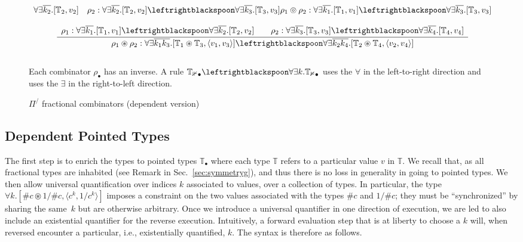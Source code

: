 \documentclass[a4paper,USenglish]{lipics-v2016-utf8x}
\newcommand{\hash}{\#}
\newcommand{\order}[1]{\hash #1}
\newcommand{\iorder}[1]{1/\hash #1}
\newcommand{\Rule}[4]{
\makebox{{\rm #1}
$\displaystyle
\frac{\begin{array}{l}#2\\\end{array}}
{\begin{array}{l}#3\\\end{array}}$
 #4}}
\newcommand{\jdg}[3]{{#1} #3}
\newcommand{\synch}{\mathsf{{synch}}}
\begin{document}
\begin{figure}[t]
{\[\begin{array}{c}
{{  \forall\exists{\overline{k_2}}.[\mathbb{T}_2,v_2]} \quad
  \rho_2 :
  \forall\exists{\overline{k_2}}.[\mathbb{T}_2,v_2] \leftrightblackspoon
  \forall\exists{\overline{k_3}}.[\mathbb{T}_3,v_3]}
{\jdg{}{}{\rho_1 \circledcirc \rho_2 :
 \forall\exists{\overline{k_1}}.[\mathbb{T}_1,v_1] \leftrightblackspoon
 \forall\exists{\overline{k_3}}.[\mathbb{T}_3},v_3]}
{}
\\
\\
\Rule{}
{\jdg{}{}{\rho_1 :
 \forall\exists{\overline{k_1}}.[\mathbb{T}_1,v_1] \leftrightblackspoon
 \forall\exists{\overline{k_2}}.[\mathbb{T}_2,v_2]}
 \qquad \rho_2 :
 \forall\exists{\overline{k_3}}.[\mathbb{T}_3,v_3] \leftrightblackspoon
 \forall\exists{\overline{k_4}}.[\mathbb{T}_4,v_4]}
{\jdg{}{}{\rho_1 \circledast \rho_2 :
  \forall\exists{\overline{k_1k_3}}.[\mathbb{T}_1 \circledast \mathbb{T}_3, \langle v_1,v_3 \rangle]
  \leftrightblackspoon
  \forall\exists{\overline{k_2k_4}}.[\mathbb{T}_2 \circledast \mathbb{T}_4}, \langle v_2,v_4 \rangle]}
{}
\end{array}\]
\\
Each combinator $\rho_\bullet$ has an inverse. A rule $\mathbb{T_1}_\bullet \leftrightblackspoon
\forall\exists{k}.\mathbb{T_2}_\bullet$ uses the $\forall$ in the left-to-right
direction and uses the $\exists$ in the right-to-left direction.
}
\caption{$\Pi^/$ fractional combinators (dependent version)}
\label{pifracd:comb}
\end{figure}

\subsection{Dependent Pointed Types}\label{sec:deppointedtypes}

The first step is to enrich the types to pointed types $\mathbb{T_\bullet}$
where each type $\mathbb{T}$ refers to a particular value $v$ in
$\mathbb{T}$. We recall that, as all fractional types are inhabited (see Remark
in Sec.~\ref{sec:symmetryg}), and thus there is no loss in generality in going
to pointed types. We then allow universal quantification over indices $k$
associated to values, over a collection of types.  In particular, the type
$\forall k.[\order{c} \circledast \iorder{c}, \langle c^k, 1/c^k \rangle]$
imposes a constraint on the two values associated with the types $\order{c}$ and
$\iorder{c}$; they must be ``synchronized'' by sharing the same~$k$ but are
otherwise arbitrary. Once we introduce a universal quantifier in one direction
of execution, we are led to also include an existential quantifier for the
reverse execution. Intuitively, a forward evaluation step that is at liberty to
choose a $k$ will, when reversed encounter a particular, i.e., existentially
quantified, $k$. The syntax is therefore as follows.
\end{document}
